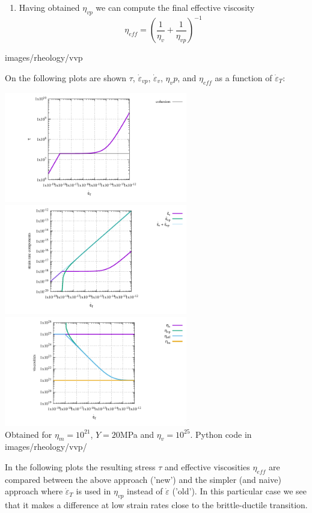\begin{itemize}
\begin{enumerate}
\item Having obtained $\eta_{vp}$ we can compute the final effective viscosity
\[
\eta_{eff} = \left( \frac{1}{\eta_v}  + \frac{1}{\eta_{vp}}  \right)^{-1}
\]
\end{enumerate}

images/rheology/vvp

On the following plots are shown $\tau$, 
$\dot\varepsilon_{vp}$, $\dot\varepsilon_v$, $\eta_vp$, and $\eta_{eff}$ 
as a function of  $\dot\varepsilon_T$: 

\begin{center}
\includegraphics[width=8cm]{images/rheology/vvp/tau.pdf}\\
\includegraphics[width=8cm]{images/rheology/vvp/strainrates.pdf}\\
\includegraphics[width=8cm]{images/rheology/vvp/viscosities.pdf}\\
{\captionfont Obtained for $\eta_m=10^{21}$, $Y=20$MPa and $\eta_v=10^{25}$. Python code 
in images/rheology/vvp/}
\end{center}

In the following plots the resulting stress $\tau$ and effective viscosities $\eta_{eff}$
are compared between the above approach ('new') and the simpler (and naive) 
approach where $\dot\varepsilon_T$ 
is used in $\eta_{vp}$ instead of $\dot\varepsilon$ ('old'). In this particular case 
we see that it makes a difference at low strain rates close to the brittle-ductile transition.


\end{itemize}

